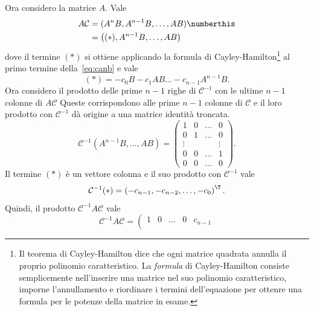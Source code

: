 \begin{steps}
    Ora considero la matrice $A$.
    Vale
    \begin{align*}
        A\mathcal C &= (A^n B, A^{n-1} B, \ldots, AB) \numberthis\label{eq:canb} \\
        &= \left((*), A^{n-1} B, \ldots, AB \right)
    \end{align*}
    dove il termine $(*)$ si ottiene applicando la formula di Cayley-Hamilton\footnote{
    Il teorema di Cayley-Hamilton dice che ogni matrice quadrata annulla il proprio
    polinomio caratteristico. La \emph{formula} di Cayley-Hamilton consiste semplicemente
    nell'inserire una matrice nel suo polinomio caratteristico, imporne l'annullamento
    e riordinare i termini dell'equazione per ottenre una formula per le potenze
    della matrice in esame.
    }
    al primo termine della~\eqref{eq:canb} e vale
    \begin{equation*}
     (*) = -c_0 B - c_{1} AB \ldots - c_{n-1}A^{n-1} B.
    \end{equation*}
    Ora considero il prodotto delle prime $n-1$ righe di  $\mathcal C^{-1}$
    con le ultime $n-1$ colonne di $A\mathcal C$
    Queste corrispondono alle prime $n-1$ colonne di $\mathcal C$ e il loro prodotto
    con $\mathcal C^{-1}$ dà origine a una matrice identità troncata.
    \begin{equation*}
        \mathcal C^{-1} (A^{n-1} B, \ldots, AB) = \left(
        \begin{array}{cccc}
            1 & 0 & \ldots & 0  \\
            0 & 1 & \ldots & 0 \\
            \vdots & & &   \vdots\\
            0 & 0 & \ldots & 1 \\
            0 & 0 & \ldots & 0
        \end{array}
        \right).
    \end{equation*}
    Il termine $(*)$ è un vettore colonna e il suo prodotto con $\mathcal C^{-1}$ vale
    \begin{equation*}
        \mathcal C^{-1}(*) = \left(
             -c_{n-1},
            -c_{n-2},
            \ldots,     -c_0
        \right)^\T.
    \end{equation*}
    Quindi, il prodotto $\mathcal C^{-1}A\mathcal C$ vale
    \begin{equation*}
        \mathcal C^{-1} A \mathcal C = \left(
        \begin{array}{ccccc}
            1 & 0 & \ldots & 0 & c_{n-1} \\

\end{array}
\end{equation*}
\end{steps}
